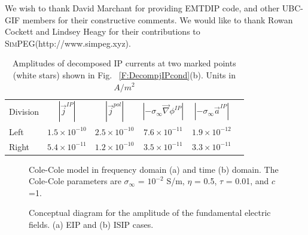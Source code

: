 \documentclass[extra,mreferee]{gji}
\newcommand{\SimPEG}{\textsc{SimPEG}\xspace}
\newcommand{\grad}{\vec \nabla}
\newcommand{\siginf}{\sigma_\infty}
\renewcommand {\j}  { {\vec j} }
\begin{document}
\begin{acknowledgments}
  We wish to thank David Marchant for providing EMTDIP code, and other UBC-GIF members for their constructive comments. We would like to thank Rowan Cockett and Lindsey Heagy for their contributions to \SimPEG (http://www.simpeg.xyz). 
\end{acknowledgments}



\clearpage

\begin{table}
 \caption{Amplitudes of decomposed IP currents at two marked points (white stars) shown in Fig. ~\ref{F:DecompjIPcond}(b). Units in $A/m^2$}
 \label{T:DecompjIPcond}
 \begin{tabular}{@{}lccccc}
  Division & $| \j^{IP} |$ & $| \j^{pol} |$ & $| -\siginf\grad \phi^{IP} |$ & $| -\siginf\vec{a}^{IP} |$ \\
  Left  & $1.5\times 10^{-10}$ & $2.5\times 10^{-10}$ & $7.6\times 10^{-11}$ & $1.9\times 10^{-12}$ \\
  Right & $5.4\times 10^{-11}$ & $1.2\times 10^{-10}$ & $3.5\times 10^{-11}$ & $3.3\times 10^{-11}$ \\
 \end{tabular}
\end{table}

\clearpage

\begin{figure}
  \caption{Cole-Cole model in frequency domain (a) and time (b) domain. The Cole-Cole parameters are $\siginf$ = $10^{-2}$ S/m, $\eta $ = 0.5, $\tau$ = 0.01, and $c$=1.}
  \label{Fig:FDandTDCole}
\end{figure}

\begin{figure}  
  \caption{Conceptual diagram for the amplitude of the fundamental electric fields. (a) EIP and (b) ISIP cases.}
  \label{F:DCEM_F_current}
\end{figure}   
\end{document}
